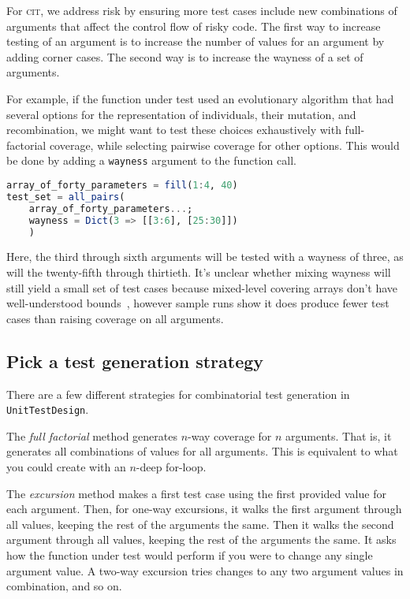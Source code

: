 \documentclass{juliacon}
\newcommand{\utd}{\texttt{UnitTestDesign}\xspace}
\newcommand{\cit}{\textsc{cit}\xspace}
\begin{document}
\vskip 6pt
For \cit, we address risk by ensuring more test cases include new combinations of arguments that affect the control flow of risky code. The first way to increase testing of an argument is to increase the number of values for an argument by adding corner cases. The second way is to increase the wayness of a set of arguments.

\vskip 6pt
For example, if the function under test used an evolutionary algorithm that had several options for the representation of individuals, their mutation, and recombination, we might want to test these choices exhaustively with full-factorial coverage, while selecting pairwise coverage for other options. This would be done by adding a \verb|wayness| argument to the function call.

\begin{lstlisting}[language=Julia]
array_of_forty_parameters = fill(1:4, 40)
test_set = all_pairs(
    array_of_forty_parameters...;
    wayness = Dict(3 => [[3:6], [25:30]])
    )
\end{lstlisting}
Here, the third through sixth arguments will be tested with a wayness of three, as will the twenty-fifth through thirtieth. It's unclear whether mixing wayness will still yield a small set of test cases because mixed-level covering arrays don't have well-understood bounds~\cite{Cohen2003-pg}, however sample runs show it does produce fewer test cases than raising coverage on all arguments.


\subsection{Pick a test generation strategy}

There are a few different strategies for combinatorial test generation in \utd.

\vskip 6pt
The \emph{full factorial} method generates $n$-way coverage for $n$ arguments. That is, it generates all combinations of values for all arguments. This is equivalent to what you could create with an $n$-deep for-loop.

\vskip 6pt
The \emph{excursion} method makes a first test case using the first provided value for each argument. Then, for one-way excursions, it walks the first argument through all values, keeping the rest of the arguments the same. Then it walks the second argument through all values, keeping the rest of the arguments the same. It asks how the function under test would perform if you were to change any single argument value. A two-way excursion tries changes to any two argument values in combination, and so on.
\end{document}
